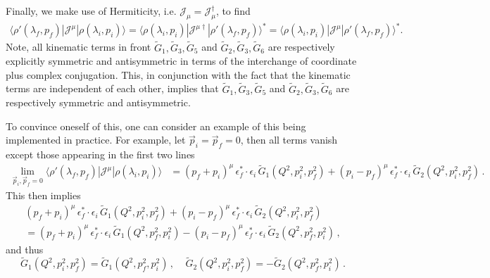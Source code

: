 Finally, we make use of Hermiticity, i.e. ${\mathcal{J}}_{\mu}={\mathcal{J}}^\dag_{\mu}$, to find
\begin{align}
\langle\rho'(\lambda_f,p_f)|{\mathcal{J}}^{\mu}|\rho(\lambda_i,p_i)\rangle
=
\langle\rho(\lambda_i,p_i)|{\mathcal{J}}^{\mu\dag}|\rho'(\lambda_f,p_f)\rangle^*
=
\langle\rho(\lambda_i,p_i)|{\mathcal{J}}^{\mu}|\rho'(\lambda_f,p_f)\rangle^*.
\end{align}
Note, all kinematic terms in front $\widetilde{G}_1,\widetilde{G}_3,\widetilde{G}_5$ and $\widetilde{G}_2,\widetilde{G}_3,\widetilde{G}_6$ are respectively explicitly symmetric and antisymmetric in terms of the interchange of coordinate plus complex conjugation. This, in conjunction with the fact that the kinematic terms are independent of each other, implies that $\widetilde{G}_1,\widetilde{G}_3,\widetilde{G}_5$ and $\widetilde{G}_2,\widetilde{G}_3,\widetilde{G}_6$ are respectively symmetric and antisymmetric. 

To convince oneself of this, one can consider an example of this being implemented in practice. For example, let $\vec{p}_i=\vec{p}_f=0$, then all terms vanish except those appearing in the first two lines
\begin{align}
\lim_{\vec{p}_i,\vec{p}_f=0}\langle\rho'(\lambda_f,p_f)|{\mathcal{J}}^{\mu}|\rho(\lambda_i,p_i)\rangle
&=
(p_f+p_i)^\mu \,\epsilon_f^*\cdot \epsilon_i\, \widetilde{G}_1(Q^2,p_i^2,p_f^2)
+(p_i-p_f)^\mu \,\epsilon_f^*\cdot \epsilon_i\,\widetilde{G}_2(Q^2,p_i^2,p_f^2) \,.
\end{align} 
{\mh This then implies
\begin{multline}
(p_f+p_i)^\mu \,\epsilon_f^*\cdot \epsilon_i\, \widetilde{G}_1(Q^2,p_i^2,p_f^2)
+(p_i-p_f)^\mu \,\epsilon_f^*\cdot \epsilon_i\,\widetilde{G}_2(Q^2,p_i^2,p_f^2) \\[5pt]
= (p_f+p_i)^\mu \,\epsilon_f^*\cdot \epsilon_i\, \widetilde{G}_1(Q^2,p_f^2,p_i^2)
-(p_i-p_f)^\mu \,\epsilon_f^*\cdot \epsilon_i\,\widetilde{G}_2(Q^2,p_f^2,p_i^2) \,,
\end{multline} 
and thus
\begin{equation}
\widetilde{G}_1(Q^2,p_i^2,p_f^2) = \widetilde{G}_1(Q^2,p_f^2,p_i^2) \,, \ \ \ \ \ \widetilde{G}_2(Q^2,p_i^2,p_f^2) = - \widetilde{G}_2(Q^2,p_f^2,p_i^2) \,.
\end{equation}
}

